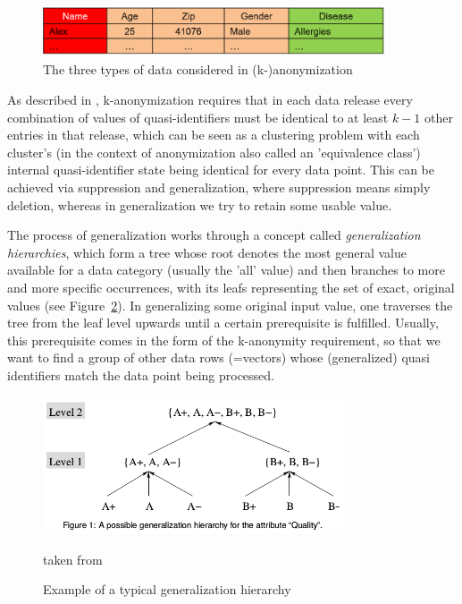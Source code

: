 \documentclass{llncs}
\begin{document}
\begin{figure}[!t]
	\begin{center}
		\includegraphics[width=0.9\textwidth]{figures/anonym/3typesofdata}
		\caption{The three types of data considered in (k-)anonymization}
		\label{fig:anon_categories}
	\end{center}
\end{figure}

As described in \cite{ciriani2007kappa}, k-anonymization requires that in each data release every combination of values of quasi-identifiers must be identical to at least $k-1$ other entries in that release, which can be seen as a clustering problem with each cluster's (in the context of anonymization also called an 'equivalence class') internal quasi-identifier state being identical for every data point. This can be achieved via suppression and generalization, where suppression means simply deletion, whereas in generalization we try to retain some usable value.

The process of generalization works through a concept called \textit{generalization hierarchies}, which form a tree whose root denotes the most general value available for a data category (usually the 'all' value) and then branches to more and more specific occurrences, with its leafs representing the set of exact, original values (see Figure~\ref{fig:gen_hierarchy}). In generalizing some original input value, one traverses the tree from the leaf level upwards until a certain prerequisite is fulfilled. Usually, this prerequisite comes in the form of the k-anonymity requirement, so that we want to find a group of other data rows (=vectors) whose (generalized) quasi identifiers match the data point being processed.

\begin{figure}[!t]
	\begin{center}
		\includegraphics[width=0.8\textwidth]{figures/anonym/gen_hierarchy}
		\caption{Example of a typical generalization hierarchy}
		\label{fig:gen_hierarchy}
		\small
		taken from \cite{aggarwal2005approximation}
	\end{center}
\end{figure}
\end{document}
